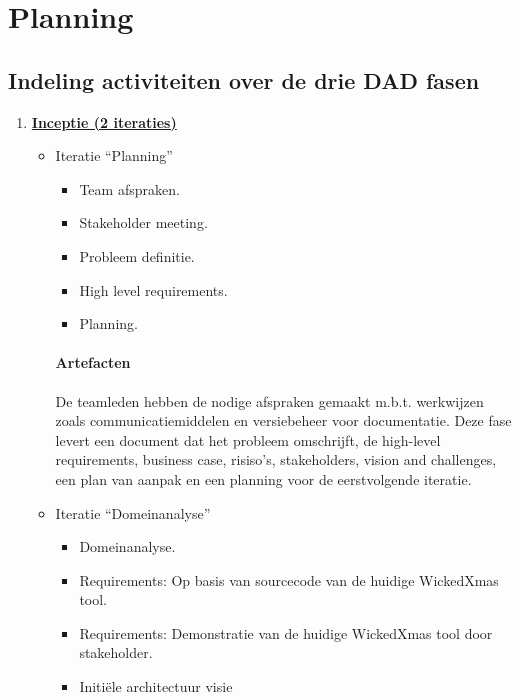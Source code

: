 
\section{Planning}
\subsection{Indeling activiteiten over de drie DAD fasen}
\begin{enumerate}
\item \underline{\textbf{Inceptie (2 iteraties)}}
		\begin{itemize}
		\item Iteratie ``Planning''
			\begin{itemize}
			\item Team afspraken.
			\item Stakeholder meeting.
			\item Probleem definitie.
			\item High level requirements.
			\item Planning.
			\end{itemize}
		\paragraph{Artefacten}
		De teamleden hebben de nodige afspraken gemaakt m.b.t. werkwijzen zoals
		communicatiemiddelen en versiebeheer voor documentatie. Deze fase levert
		een document dat het probleem omschrijft,  de high-level requirements,
		business case, risiso's, stakeholders, vision and challenges, een plan van
		aanpak en een planning voor de eerstvolgende iteratie.
		\item Iteratie ``Domeinanalyse''
			\begin{itemize}
			\item Domeinanalyse.
			\item Requirements: Op basis van sourcecode van de huidige WickedXmas tool.
			\item Requirements: Demonstratie van de huidige WickedXmas tool door
			stakeholder.
			\item Initi\"ele architectuur visie
			\end{itemize}

\end{itemize}
\end{enumerate}
